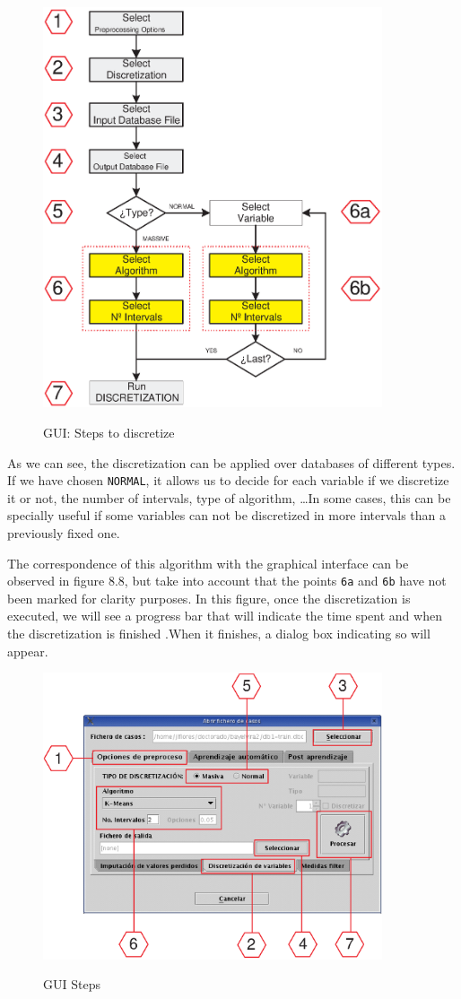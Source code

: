 \begin{figure}[htb]
\begin{center}
\label{cap08:07}
\includegraphics[width=100mm]{Learning/Preprocessing/fig/figure-8.07.ps} 
\caption{GUI: Steps to discretize}
\end{center}
\end{figure}

As we can see, the discretization can be applied over databases of different types. If we have chosen
\verb=NORMAL=, it allows us to decide for each variable if we discretize it or not, the number of intervals,
type of algorithm, \ldots In some cases, this can be specially useful if some variables can not be discretized
in more intervals than a previously fixed one.

The correspondence of this algorithm with the graphical interface can be observed in figure 8.8, but take into
account that the points \verb=6a= and \verb=6b= have not been marked for clarity purposes. In this figure, once
the discretization is executed, we will see a progress bar that will indicate the time spent and when 
the discretization is finished .When it finishes, a dialog box indicating so will appear.

\begin{figure}[htb]
\begin{center}
\label{cap08:08}
\includegraphics[width=100mm]{Learning/Preprocessing/fig/figure-8.08.ps} 
\caption{GUI Steps}
\end{center}
\end{figure}